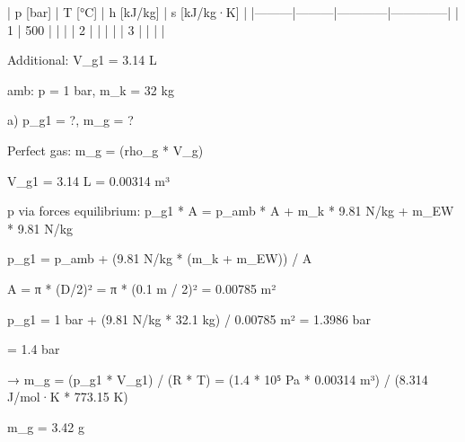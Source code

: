 | p [bar] | T [°C] | h [kJ/kg] | s [kJ/kg·K] |  
|---------|---------|------------|--------------|  
| 1       | 500     |            |              |  
| 2       |         |            |              |  
| 3       |         |            |              |  

Additional:  
V_g1 = 3.14 L  

amb: p = 1 bar, m_k = 32 kg  

a) p_g1 = ?, m_g = ?  

Perfect gas:  
m_g = (rho_g * V_g)  

V_g1 = 3.14 L = 0.00314 m³  

p via forces equilibrium:  
p_g1 * A = p_amb * A + m_k * 9.81 N/kg + m_EW * 9.81 N/kg  

p_g1 = p_amb + (9.81 N/kg * (m_k + m_EW)) / A  

A = π * (D/2)² = π * (0.1 m / 2)² = 0.00785 m²  

p_g1 = 1 bar + (9.81 N/kg * 32.1 kg) / 0.00785 m² = 1.3986 bar  

= 1.4 bar  

→ m_g = (p_g1 * V_g1) / (R * T) = (1.4 * 10⁵ Pa * 0.00314 m³) / (8.314 J/mol·K * 773.15 K)  

m_g = 3.42 g